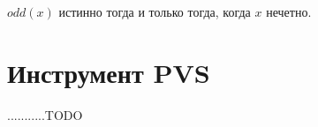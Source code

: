 \documentclass[14pt, twoside]{extreport}
\begin{document}
$odd(x)$ истинно тогда и только тогда, когда $x$ нечетно.




\section{Инструмент PVS}
...........TODO




\end{document}
